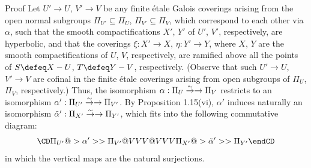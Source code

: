 \demo
{Proof} Let $U'\to U$, $V'\to V$ be any 
finite \'etale Galois coverings arising from 
the open normal subgroups $\Pi_{U'}\subseteq \Pi_U$, $\Pi_{V'}\subseteq \Pi_V$, 
which correspond to each other via $\alpha$, such that the smooth compactifications 
$X'$, $Y'$ of $U'$, $V'$, respectively, are hyperbolic, and that the coverings
$\xi:X'\to X$, $\eta : Y'\to Y$, where $X$, $Y$ are the smooth compactifications 
of $U$, $V$, respectively, 
are %
ramified above all the points of $S\defeq X-U$, $T\defeq Y-V$, respectively. 
(Observe that such $U'\to U$, $V'\to V$ are cofinal in 
the finite \'etale coverings arising from open subgroups 
of $\Pi_U$, $\Pi_V$, respectively.)
Thus, the isomorphism $\alpha:\Pi_U\overset \sim \to \rightarrow\Pi_V$ restricts to 
an isomorphism
$\alpha':\Pi_{U'}\overset \sim \to \rightarrow \Pi_{V'}$. 
By Proposition 1.15(vi), $\alpha'$ induces naturally an 
isomorphism $\tilde \alpha ':\Pi_{X'}\overset \sim \to \rightarrow \Pi_{Y'}$, 
which fits into the 
following commutative diagram:
$$
\CD
\Pi_{U'} @>\alpha '>> \Pi_{V'}\\
@VVV            @VVV  \\
\Pi_{X'} @>\tilde \alpha '>> \Pi_{Y'}\\
\endCD
$$
in which the vertical maps are the natural surjections. 

